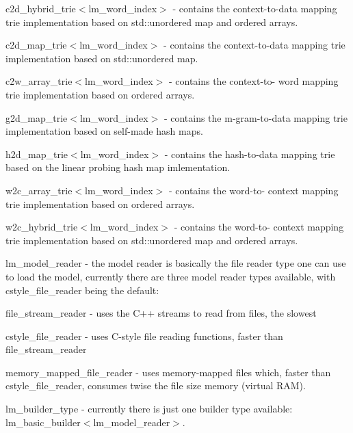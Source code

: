\begin{DoxyItemize}
\begin{DoxyItemize}
\item {\ttfamily c2d\+\_\+hybrid\+\_\+trie$<$lm\+\_\+word\+\_\+index$>$} -\/ contains the context-\/to-\/data mapping trie implementation based on {\ttfamily std\+::unordered} map and ordered arrays.
\item {\ttfamily c2d\+\_\+map\+\_\+trie$<$lm\+\_\+word\+\_\+index$>$} -\/ contains the context-\/to-\/data mapping trie implementation based on {\ttfamily std\+::unordered map}.
\item {\ttfamily c2w\+\_\+array\+\_\+trie$<$lm\+\_\+word\+\_\+index$>$} -\/ contains the context-\/to-\/ word mapping trie implementation based on ordered arrays.
\item {\ttfamily g2d\+\_\+map\+\_\+trie$<$lm\+\_\+word\+\_\+index$>$} -\/ contains the m-\/gram-\/to-\/data mapping trie implementation based on self-\/made hash maps.
\item {\ttfamily h2d\+\_\+map\+\_\+trie$<$lm\+\_\+word\+\_\+index$>$} -\/ contains the hash-\/to-\/data mapping trie based on the linear probing hash map imlementation.
\item {\ttfamily w2c\+\_\+array\+\_\+trie$<$lm\+\_\+word\+\_\+index$>$} -\/ contains the word-\/to-\/ context mapping trie implementation based on ordered arrays.
\item {\ttfamily w2c\+\_\+hybrid\+\_\+trie$<$lm\+\_\+word\+\_\+index$>$} -\/ contains the word-\/to-\/ context mapping trie implementation based on {\ttfamily std\+::unordered} map and ordered arrays.
\end{DoxyItemize}
\item {\ttfamily lm\+\_\+model\+\_\+reader} -\/ the model reader is basically the file reader type one can use to load the model, currently there are three model reader types available, with {\ttfamily cstyle\+\_\+file\+\_\+reader} being the default\+:
\begin{DoxyItemize}
\item {\ttfamily file\+\_\+stream\+\_\+reader} -\/ uses the C++ streams to read from files, the slowest
\item {\ttfamily cstyle\+\_\+file\+\_\+reader} -\/ uses C-\/style file reading functions, faster than {\ttfamily file\+\_\+stream\+\_\+reader}
\item {\ttfamily memory\+\_\+mapped\+\_\+file\+\_\+reader} -\/ uses memory-\/mapped files which, faster than {\ttfamily cstyle\+\_\+file\+\_\+reader}, consumes twise the file size memory (virtual R\+A\+M).
\end{DoxyItemize}
\item {\ttfamily lm\+\_\+builder\+\_\+type} -\/ currently there is just one builder type available\+: {\ttfamily lm\+\_\+basic\+\_\+builder$<$lm\+\_\+model\+\_\+reader$>$}.
\end{DoxyItemize}

